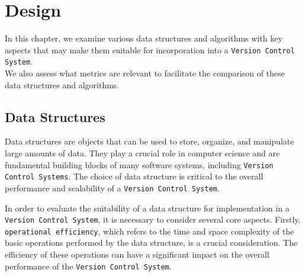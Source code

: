 \lstset{language=bash}
\newpage
\chapter{Design} %
% 
In this chapter, we examine various data structures and algorithms with key aspects that may make them suitable for incorporation into a \lstinline{Version Control System}.\\
We also assess what metrics are relevant to facilitate the comparison of these data structures and algorithms.
% 
% 
\section{Data Structures}
Data structures are objects that can be used to store, organize, and manipulate large amounts of data. They play a crucial role in computer science and are fundamental building blocks of many software systems, including \lstinline{Version Control Systems}. The choice of data structure is critical to the overall performance and scalability of a \lstinline{Version Control System}.

In order to evaluate the suitability of a data structure for implementation in a \lstinline{Version Control System}, it is necessary to consider several core aspects. Firstly, \lstinline{operational efficiency}, which refers to the time and space complexity of the basic operations performed by the data structure, is a crucial consideration. The efficiency of these operations can have a significant impact on the overall performance of the \lstinline{Version Control System}.


